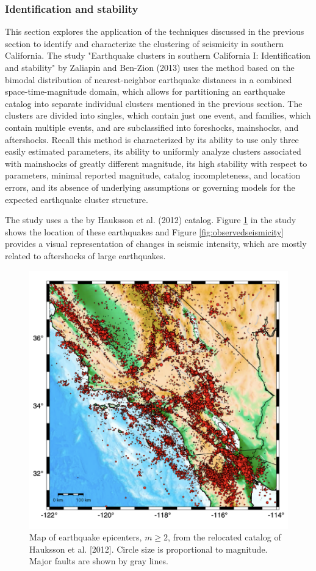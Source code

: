 \documentclass[12pt]{article} %
\theoremstyle{plain}
\begin{document}
	\subsubsection{Identification and stability}
	
	
 	This section explores the application of the techniques discussed in the previous section to identify and characterize the clustering of seismicity in southern California. The study "Earthquake clusters in southern California I: Identification and stability" by Zaliapin and Ben-Zion (2013)  uses the method based on the bimodal distribution of nearest-neighbor earthquake distances in a combined space-time-magnitude domain, which allows for partitioning an earthquake catalog into separate individual clusters mentioned in the previous section. The clusters are divided into singles, which contain just one event, and families, which contain multiple events, and are subclassified into foreshocks, mainshocks, and aftershocks. Recall this method is characterized by its ability to use only three easily estimated parameters, its ability to uniformly analyze clusters associated with mainshocks of greatly different magnitude, its high stability with respect to parameters, minimal reported magnitude, catalog incompleteness, and location errors, and its absence of underlying assumptions or governing models for the expected earthquake cluster structure.
		
	The study uses a the by Hauksson et al. (2012) catalog. Figure \ref{fig:socalseismicity} in the study shows the location of these earthquakes and Figure \ref{fig:observedseismicity} provides a visual representation of changes in seismic intensity, which are mostly related to aftershocks of large earthquakes.
	
	\begin{figure}[t]
		\centering
		\includegraphics[width=0.7\linewidth]{Thesis_Figures,Images,Tables/socal_seismicity}
		\caption{Map of earthquake epicenters, $m \geq 2$, from the relocated catalog of Hauksson et al. [2012]. Circle size is proportional to magnitude. Major faults are shown by gray lines.}
		\label{fig:socalseismicity}
	\end{figure}
	
\end{document}
